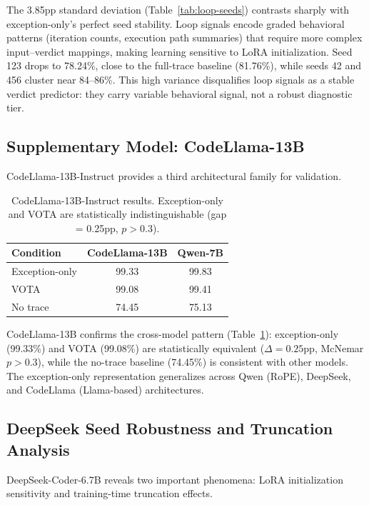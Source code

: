 \documentclass[11pt,a4paper]{article}
\begin{document}
The 3.85pp standard deviation (Table~\ref{tab:loop-seeds}) contrasts sharply with exception-only's perfect seed stability.
Loop signals encode graded behavioral patterns (iteration counts, execution path summaries) that require more complex input--verdict mappings, making learning sensitive to LoRA initialization.
Seed 123 drops to 78.24\%, close to the full-trace baseline (81.76\%), while seeds 42 and 456 cluster near 84--86\%.
This high variance disqualifies loop signals as a stable verdict predictor: they carry variable behavioral signal, not a robust diagnostic tier.

\subsection{Supplementary Model: CodeLlama-13B}

CodeLlama-13B-Instruct provides a third architectural family for validation.

\begin{table}[t]
\centering
\small
\begin{tabular}{lcc}
\toprule
\textbf{Condition} & \textbf{CodeLlama-13B} & \textbf{Qwen-7B} \\
\midrule
Exception-only & 99.33 & 99.83 \\
VOTA           & 99.08 & 99.41 \\
No trace       & 74.45 & 75.13 \\
\bottomrule
\end{tabular}
\caption{CodeLlama-13B-Instruct results. Exception-only and VOTA are statistically indistinguishable (gap = 0.25pp, $p > 0.3$).}
\label{tab:codellama}
\end{table}

CodeLlama-13B confirms the cross-model pattern (Table~\ref{tab:codellama}): exception-only (99.33\%) and VOTA (99.08\%) are statistically equivalent ($\Delta = 0.25$pp, McNemar $p > 0.3$), while the no-trace baseline (74.45\%) is consistent with other models.
The exception-only representation generalizes across Qwen (RoPE), DeepSeek, and CodeLlama (Llama-based) architectures.

\subsection{DeepSeek Seed Robustness and Truncation Analysis}

DeepSeek-Coder-6.7B reveals two important phenomena: LoRA initialization sensitivity and training-time truncation effects.
\end{document}
